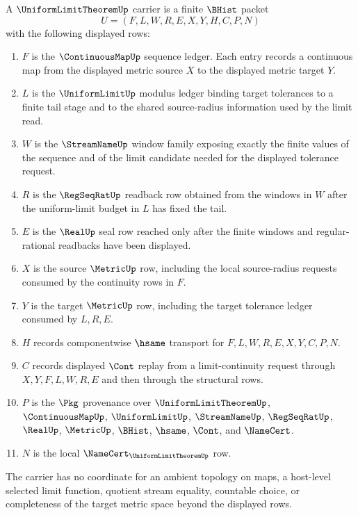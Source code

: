 \begin{definition}
\label{def:uniform-limit-theorem-carrier}
A $\UniformLimitTheoremUp$ carrier is a finite $\BHist$ packet
$$
U=(F,L,W,R,E,X,Y,H,C,P,N)
$$
with the following displayed rows:
\begin{enumerate}
\item $F$ is the $\ContinuousMapUp$ sequence ledger. Each entry records a continuous map from the displayed metric source $X$ to the displayed metric target $Y$.
\item $L$ is the $\UniformLimitUp$ modulus ledger binding target tolerances to a finite tail stage and to the shared source-radius information used by the limit read.
\item $W$ is the $\StreamNameUp$ window family exposing exactly the finite values of the sequence and of the limit candidate needed for the displayed tolerance request.
\item $R$ is the $\RegSeqRatUp$ readback row obtained from the windows in $W$ after the uniform-limit budget in $L$ has fixed the tail.
\item $E$ is the $\RealUp$ seal row reached only after the finite windows and regular-rational readbacks have been displayed.
\item $X$ is the source $\MetricUp$ row, including the local source-radius requests consumed by the continuity rows in $F$.
\item $Y$ is the target $\MetricUp$ row, including the target tolerance ledger consumed by $L,R,E$.
\item $H$ records componentwise $\hsame$ transport for $F,L,W,R,E,X,Y,C,P,N$.
\item $C$ records displayed $\Cont$ replay from a limit-continuity request through $X,Y,F,L,W,R,E$ and then through the structural rows.
\item $P$ is the $\Pkg$ provenance over $\UniformLimitTheoremUp$, $\ContinuousMapUp$, $\UniformLimitUp$, $\StreamNameUp$, $\RegSeqRatUp$, $\RealUp$, $\MetricUp$, $\BHist$, $\hsame$, $\Cont$, and $\NameCert$.
\item $N$ is the local $\NameCert_{\UniformLimitTheoremUp}$ row.
\end{enumerate}
The carrier has no coordinate for an ambient topology on maps, a host-level selected limit function, quotient stream equality, countable choice, or completeness of the target metric space beyond the displayed rows.
\end{definition}

